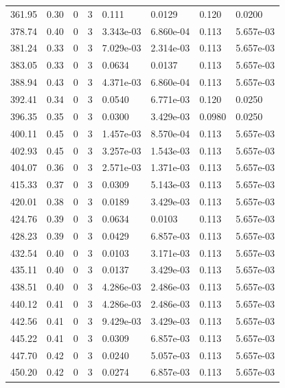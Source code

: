 \documentclass[preview]{standalone}
\begin{document}
{{{{\begin{tabular}{L{1.2cm}C{1.2cm} C{0.3cm}C{0.5cm} C{1.4cm}C{1.4cm} C{1.4cm}C{1.4cm}}
  361.95  &  0.30  & 0     &  3 &  0.111  & 0.0129  & 0.120 &  0.0200   \\ 
  378.74  &  0.40  & 0     &  3 &  3.343e-03  & 6.860e-04  & 0.113 &  5.657e-03   \\ 
  381.24  &  0.33  & 0     &  3 &  7.029e-03  & 2.314e-03  & 0.113 &  5.657e-03   \\ 
  383.05  &  0.33  & 0     &  3 &  0.0634  & 0.0137  & 0.113 &  5.657e-03   \\ 
  388.94  &  0.43  & 0     &  3 &  4.371e-03  & 6.860e-04  & 0.113 &  5.657e-03   \\ 
  392.41  &  0.34  & 0     &  3 &  0.0540  & 6.771e-03  & 0.120 &  0.0250   \\ 
  396.35  &  0.35  & 0     &  3 &  0.0300  & 3.429e-03  & 0.0980 &  0.0250   \\ 
  400.11  &  0.45  & 0     &  3 &  1.457e-03  & 8.570e-04  & 0.113 &  5.657e-03   \\ 
  402.93  &  0.45  & 0     &  3 &  3.257e-03  & 1.543e-03  & 0.113 &  5.657e-03   \\ 
  404.07  &  0.36  & 0     &  3 &  2.571e-03  & 1.371e-03  & 0.113 &  5.657e-03   \\ 
  415.33  &  0.37  & 0     &  3 &  0.0309  & 5.143e-03  & 0.113 &  5.657e-03   \\ 
  420.01  &  0.38  & 0     &  3 &  0.0189  & 3.429e-03  & 0.113 &  5.657e-03   \\ 
  424.76  &  0.39  & 0     &  3 &  0.0634  & 0.0103  & 0.113 &  5.657e-03   \\ 
  428.23  &  0.39  & 0     &  3 &  0.0429  & 6.857e-03  & 0.113 &  5.657e-03   \\ 
  432.54  &  0.40  & 0     &  3 &  0.0103  & 3.171e-03  & 0.113 &  5.657e-03   \\ 
  435.11  &  0.40  & 0     &  3 &  0.0137  & 3.429e-03  & 0.113 &  5.657e-03   \\ 
  438.51  &  0.40  & 0     &  3 &  4.286e-03  & 2.486e-03  & 0.113 &  5.657e-03   \\ 
  440.12  &  0.41  & 0     &  3 &  4.286e-03  & 2.486e-03  & 0.113 &  5.657e-03   \\ 
  442.56  &  0.41  & 0     &  3 &  9.429e-03  & 3.429e-03  & 0.113 &  5.657e-03   \\ 
  445.22  &  0.41  & 0     &  3 &  0.0309  & 6.857e-03  & 0.113 &  5.657e-03   \\ 
  447.70  &  0.42  & 0     &  3 &  0.0240  & 5.057e-03  & 0.113 &  5.657e-03   \\ 
  450.20  &  0.42  & 0     &  3 &  0.0274  & 6.857e-03  & 0.113 &  5.657e-03   \\ 

\end{tabular}}}}}
\end{document}

